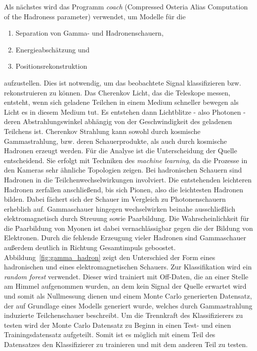 Als nächstes wird das Programm \textit{coach} (Compressed Osteria Alias
Computation of the Hadroness parameter) verwendet, um Modelle für die
\begin{enumerate}
  \item Separation von Gamma- und Hadronenschauern,
  \item Energieabschätzung und
  \item Positionsrekonstruktion
\end{enumerate}
aufzustellen. Dies ist notwendig, um das beobachtete Signal klassifizieren bzw.
rekonstruieren zu können. Das Cherenkov Licht, das die Teleskope messen,
entsteht, wenn sich geladene Teilchen in einem Medium schneller bewegen als
Licht es in diesem Medium tut. Es entstehen dann Lichtblitze - also Photonen -
deren Abstrahlungswinkel abhängig von der Geschwindigkeit des geladenen
Teilchens ist. Cherenkov Strahlung kann sowohl durch kosmische Gammastrahlung,
bzw. deren Schauerprodukte, als auch durch kosmische Hadronen erzeugt werden.
Für die Analyse ist die Unterscheidung der Quelle entscheidend. Sie erfolgt mit
Techniken des \textit{machine learning}, da die Prozesse in den
Kameras sehr ähnliche Topologien zeigen. Bei hadronischen Schauern sind Hadronen
in die Teilchenwechselwirkungen involviert. Die entstehenden leichteren Hadronen
zerfallen anschließend, bis sich Pionen, also die leichtesten Hadronen bilden.
Dabei fächert sich der Schauer im Vergleich zu Photonenschauern erheblich auf.
Gammaschauer hingegen wechselwirken beinahe ausschließlich elektromagnetisch
durch Streuung sowie Paarbildung. Die Wahrscheinlichkeit für die Paarbildung von
Myonen ist dabei vernachlässigbar gegen die der Bildung von Elektronen. Durch
die fehlende Erzeugung vieler Hadronen sind Gammaschauer außerdem deutlich in
Richtung Gesamtimpuls geboostet. \\
Abbildung~\ref{fig:gamma_hadron} zeigt den Unterschied der Form eines
hadronischen und eines elektromagnetischen Schauers. Zur Klassifikation wird ein
\textit{random forest} verwendet. Dieser wird trainiert mit Off-Daten, die an
einer Stelle am Himmel aufgenommen wurden, an dem kein Signal der Quelle
erwartet wird und somit als Nullmessung dienen und einem Monte Carlo generierten
Datensatz, der auf Grundlage eines Modells generiert wurde, welches durch
Gammastrahlung induzierte Teilchenschauer beschreibt. Um die Trennkraft des
Klassifizierers zu testen wird der Monte Carlo Datensatz zu Beginn in einen
Test- und einen Trainingsdatensatz aufgeteilt. Somit ist es möglich mit einem
Teil des Datensatzes den Klassifizierer zu trainieren und mit dem anderen Teil
zu testen.

